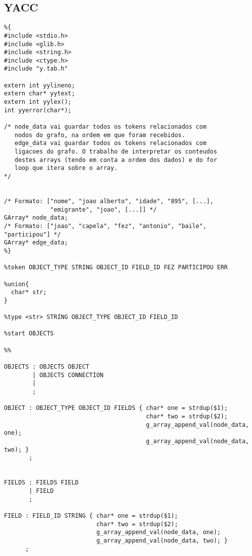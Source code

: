 \documentclass[a4paper]{article}
\begin{document}
\pagebreak
\subsection{YACC}
\label{sec:6.2}

\begin{lstlisting}
%{
#include <stdio.h>
#include <glib.h>
#include <string.h>
#include <ctype.h>
#include "y.tab.h"

extern int yylineno;
extern char* yytext;
extern int yylex();
int yyerror(char*);

/* node_data vai guardar todos os tokens relacionados com 
   nodos do grafo, na ordem em que foram recebidos.
   edge_data vai guardar todos os tokens relacionados com 
   ligacoes do grafo. O trabalho de interpretar os conteudos
   destes arrays (tendo em conta a ordem dos dados) e do for
   loop que itera sobre o array.
*/


/* Formato: ["nome", "joao alberto", "idade", "895", [...], 
             "emigrante", "joao", [...]] */
GArray* node_data;
/* Formato: ["joao", "capela", "fez", "antonio", "baile", "participou"] */
GArray* edge_data; 
%}

%token OBJECT_TYPE STRING OBJECT_ID FIELD_ID FEZ PARTICIPOU ERR

%union{
  char* str;
}

%type <str> STRING OBJECT_TYPE OBJECT_ID FIELD_ID

%start OBJECTS

%%

OBJECTS : OBJECTS OBJECT
        | OBJECTS CONNECTION
        |
        ;

OBJECT : OBJECT_TYPE OBJECT_ID FIELDS { char* one = strdup($1); 
                                        char* two = strdup($2);
                                        g_array_append_val(node_data, one);
                                        g_array_append_val(node_data, two); }
       ;


FIELDS : FIELDS FIELD
       | FIELD
       ;

FIELD : FIELD_ID STRING { char* one = strdup($1); 
                          char* two = strdup($2); 
                          g_array_append_val(node_data, one); 
                          g_array_append_val(node_data, two); }
      ;


\end{lstlisting}
\end{document}
